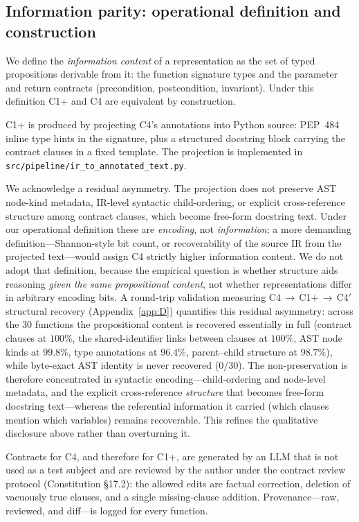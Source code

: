 \documentclass[11pt]{article}
\begin{document}
\subsection{Information parity: operational definition and construction}
\label{sec:3.2}
We define the \emph{information content} of a representation as the
set of typed propositions derivable from it: the function signature
types and the parameter and return contracts (precondition,
postcondition, invariant). Under this definition C1+ and C4 are
equivalent by construction.

C1+ is produced by projecting C4's annotations into Python source:
PEP~484 inline type hints in the signature, plus a structured
docstring block carrying the contract clauses in a fixed template.
The projection is implemented in
\texttt{src/pipeline/ir\_to\_annotated\_text.py}.

We acknowledge a residual asymmetry. The projection does not preserve
AST node-kind metadata, IR-level syntactic child-ordering, or explicit
cross-reference structure among contract clauses, which become
free-form docstring text. Under our operational definition these are
\emph{encoding}, not \emph{information}; a more demanding
definition---Shannon-style bit count, or recoverability of the source
IR from the projected text---would assign C4 strictly higher
information content. We do not adopt that definition, because the
empirical question is whether structure aids reasoning \emph{given the
same propositional content}, not whether representations differ in
arbitrary encoding bits. A round-trip validation measuring
C4\,$\to$\,C1+\,$\to$\,C4$'$ structural recovery
(Appendix~\ref{app:D}) quantifies this residual asymmetry: across the
30 functions the propositional content is recovered essentially in
full (contract clauses at $100\%$, the shared-identifier links between
clauses at $100\%$, AST node kinds at $99.8\%$, type annotations at
$96.4\%$, parent--child structure at $98.7\%$), while byte-exact AST
identity is never recovered ($0/30$). The non-preservation is therefore
concentrated in syntactic encoding---child-ordering and node-level
metadata, and the explicit cross-reference \emph{structure} that becomes
free-form docstring text---whereas the referential information it carried
(which clauses mention which variables) remains recoverable. This refines
the qualitative disclosure above rather than overturning it.

Contracts for C4, and therefore for C1+, are generated by an LLM that
is not used as a test subject and are reviewed by the author under the
contract review protocol (Constitution \S17.2): the allowed edits are
factual correction, deletion of vacuously true clauses, and a single
missing-clause addition. Provenance---raw, reviewed, and diff---is
logged for every function.
\end{document}
